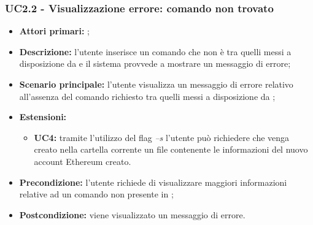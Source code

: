 \subsubsection{UC2.2 - Visualizzazione errore: comando non trovato}
\begin{itemize}
	\item \textbf{Attori primari:} \ug{};
	\item \textbf{Descrizione:} l’utente inserisce un comando che non è tra quelli messi a disposizione da \ecli{} e il sistema provvede a mostrare un messaggio di errore;  
	\item \textbf{Scenario principale:} l’utente visualizza un messaggio di errore relativo all’assenza del comando richiesto tra quelli messi a disposizione da \ecli{}; 
	\item \textbf{Estensioni:} 
	\begin{itemize}
		\item \textbf{UC4:} tramite l’utilizzo del flag \textit{–s} l’utente può richiedere che venga creato nella cartella corrente un file contenente le informazioni del nuovo account Ethereum creato.
	\end{itemize}
	\item \textbf{Precondizione:} l’utente richiede di visualizzare maggiori informazioni relative ad un comando non presente in \ecli{};  
	\item \textbf{Postcondizione:} viene visualizzato un messaggio di errore. 
\end{itemize}